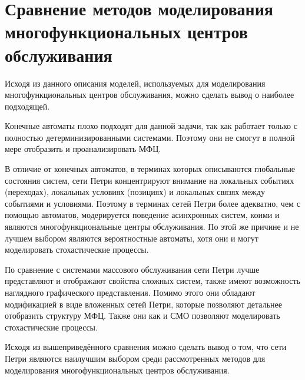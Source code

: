 \chapter[Сравнение методов моделирования многофункциональных\\центров обслуживания]{Сравнение методов моделирования\\многофункциональных центров\\обслуживания}

Исходя из данного описания моделей, используемых для моделирования многофункциональных центров обслуживания, можно сделать вывод о наиболее подходящей.

Конечные автоматы плохо подходят для данной задачи, так как работает только с полностью детерминизированными системами. Поэтому они не смогут в полной мере отобразить и проанализировать МФЦ. 

В отличие от конечных автоматов, в терминах которых описываются глобальные состояния систем, сети Петри концентрируют внимание на локальных событиях (переходах), локальных условиях (позициях) и локальных связях между событиями и условиями. Поэтому в терминах сетей Петри более адекватно, чем с помощью автоматов, модерируется поведение асинхронных систем, коими и являются многофункциональные центры обслуживания. По этой же причине и не лучшем выбором являются вероятностные автоматы, хотя они и могут моделировать стохастические процессы.

По сравнение с системами массового обслуживания сети Петри лучше представляют и отображают свойства сложных систем, также имеют возможность наглядного графического представления. Помимо этого они обладают модификацией в виде вложенных сетей Петри, которые позволяют детальнее отобразить структуру МФЦ. Также они как и СМО позволяют моделировать стохастические процессы.

Исходя из вышеприведённого сравнения можно сделать вывод о том, что сети Петри являются наилучшим выбором среди рассмотренных методов для моделирования многофункциональных центров обслуживания.